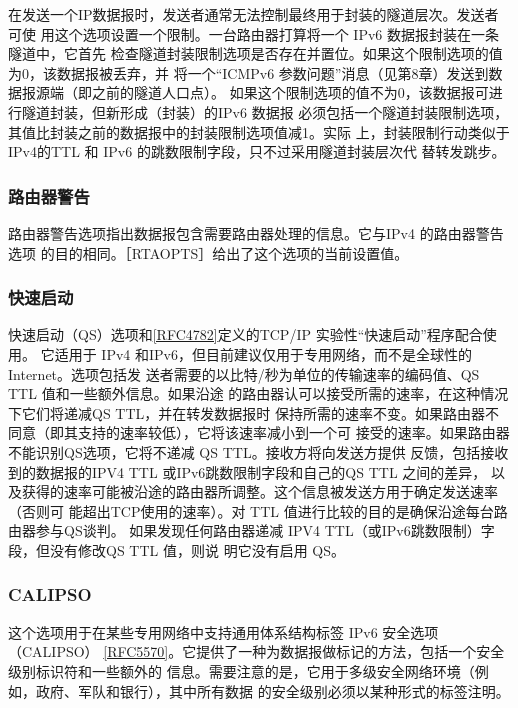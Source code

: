 在发送一个IP数据报时，发送者通常无法控制最终用于封装的隧道层次。发送者可使
用这个选项设置一个限制。一台路由器打算将一个 IPv6 数据报封装在一条隧道中，它首先
检查隧道封装限制选项是否存在并置位。如果这个限制选项的值为0，该数据报被丢弃，并
将一个“ICMPv6 参数问题”消息（见第8章）发送到数据报源端（即之前的隧道人口点）。
如果这个限制选项的值不为0，该数据报可进行隧道封装，但新形成（封装）的IPv6 数据报
必须包括一个隧道封装限制选项，其值比封装之前的数据报中的封装限制选项值减1。实际
上，封装限制行动类似于IPv4的TTL 和 IPv6 的跳数限制字段，只不过采用隧道封装层次代
替转发跳步。

\subsubsection{路由器警告}
路由器警告选项指出数据报包含需要路由器处理的信息。它与IPv4 的路由器警告选项
的目的相同。［RTAOPTS］给出了这个选项的当前设置值。

\subsubsection{快速启动}
快速启动（QS）选项和\href{https://www.rfc-editor.org/rfc/rfc4782}{[RFC4782]}定义的TCP/IP
实验性“快速启动”程序配合使用。
它适用于 IPv4 和IPv6，但目前建议仅用于专用网络，而不是全球性的 Internet。选项包括发
送者需要的以比特/秒为单位的传输速率的编码值、QS TTL 值和一些额外信息。如果沿途
的路由器认可以接受所需的速率，在这种情况下它们将递减QS TTL，并在转发数据报时
保持所需的速率不变。如果路由器不同意（即其支持的速率较低），它将该速率减小到一个可
接受的速率。如果路由器不能识别QS选项，它将不递减 QS TTL。接收方将向发送方提供
反馈，包括接收到的数据报的IPV4 TTL 或IPv6跳数限制字段和自己的QS TTL 之间的差异，
以及获得的速率可能被沿途的路由器所调整。这个信息被发送方用于确定发送速率（否则可
能超出TCP使用的速率）。对 TTL 值进行比较的目的是确保沿途每台路由器参与QS谈判。
如果发现任何路由器递减 IPV4 TTL（或IPv6跳数限制）字段，但没有修改QS TTL 值，则说
明它没有启用 QS。

\subsubsection{CALIPSO}
这个选项用于在某些专用网络中支持通用体系结构标签 IPv6 安全选项（CALIPSO）
\href{https://www.rfc-editor.org/rfc/rfc5570}{[RFC5570]}。它提供了一种为数据报做标记的方法，包括一个安全级别标识符和一些额外的
信息。需要注意的是，它用于多级安全网络环境（例如，政府、军队和银行），其中所有数据
的安全级别必须以某种形式的标签注明。

